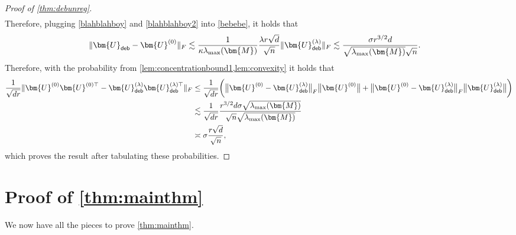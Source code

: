 \documentclass[10pt]{article}
\theoremstyle{definition}
\begin{document}
\begin{proof}[Proof of \cref{thm:debunreg}]
\begin{align}
\end{align}
Therefore, plugging \eqref{blahblahboy} and \eqref{blahblahboy2} into \eqref{bebebe}, it holds that
\begin{align*}
     \| \bm{U}_{{\sf deb}} - \bm{U}^{(0)} \|_F &\lesssim \frac{1}{\kappa \lambda_{\max}(\bm{M})} \frac{\lambda r \sqrt{d}}{\sqrt{n}} \| \bm{U}_{{\sf deb}}^{(\lambda)} \|_F \lesssim \frac{\sigma r^{3/2} d}{ \sqrt{\lambda_{\max}(\bm{M})} \sqrt{n}}.
\end{align*}
Therefore, with the probability from \cref{lem:concentrationbound1,lem:convexity} it holds that 
\begin{align}
    \frac{1}{\sqrt{dr}} \| \bm{U}^{(0)} \bm{U}^{(0)\top} - \bm{U}^{(\lambda)}_{{\sf deb}} \bm{U}^{(\lambda)\top}_{{\sf deb}} \|_F &\leq \frac{1}{\sqrt{dr}} \bigg( \big\| \bm{U}^{(0)}  - \bm{U}^{(\lambda)}_{{\sf deb}} \big\|_F \big\| \bm{U}^{(0)}\big\| + \big\| \bm{U}^{(0)} - \bm{U}^{(\lambda)}_{{\sf deb}} \big\|_F \big\| \bm{U}^{(\lambda)}_{{\sf deb}} \big\| \bigg) \\
    &\lesssim \frac{1}{\sqrt{dr}} \frac{r^{3/2} d \sigma  \sqrt{\lambda_{\max}(\bm{M})}}{\sqrt{n} \sqrt{\lambda_{\max}(\bm{M})}} \\
    &\asymp \sigma \frac{r \sqrt{d}}{\sqrt{n}},
\end{align}
which proves the result after tabulating these probabilities.
\end{proof}

\section{Proof of \cref{thm:mainthm} } \label{sec:mainthmproof}
We now have all the pieces to prove \cref{thm:mainthm}.
\end{document}
